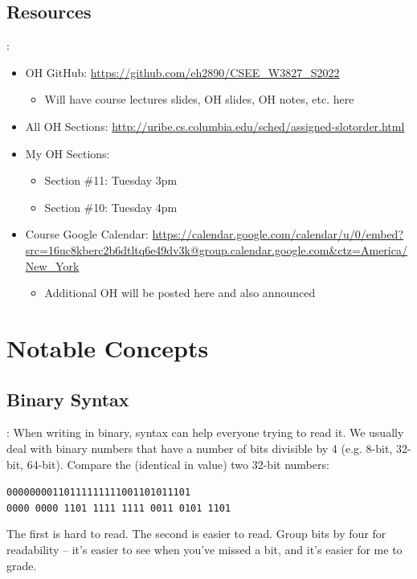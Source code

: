 \documentclass{../slides}
\begin{document}
\subsection{Resources}
\begin{frame}{\secname: \subsecname}
    \begin{itemize}
        \item OH GitHub: \url{https://github.com/eh2890/CSEE_W3827_S2022}
        \begin{itemize}
            \item Will have course lectures slides, OH slides, OH notes, etc. here
        \end{itemize}
        \item All OH Sections: \url{http://uribe.cs.columbia.edu/sched/assigned-slotorder.html}
        \item My OH Sections:
        \begin{itemize}
            \item Section \#11: Tuesday 3pm
            \item Section \#10: Tuesday 4pm
        \end{itemize}
        \item Course Google Calendar: \url{https://calendar.google.com/calendar/u/0/embed?src=16uc8kberc2b6dtltq6e49dv3k@group.calendar.google.com&ctz=America/New_York}
        \begin{itemize}
            \item Additional OH will be posted here and also announced
        \end{itemize}
    \end{itemize}
\end{frame}

\section{Notable Concepts}
\subsection{Binary Syntax}
\begin{frame}{\secname: \subsecname}
    When writing in binary, syntax can help everyone trying to read it. We usually deal with binary numbers that have a number of bits divisible by 4 (e.g. 8-bit, 32-bit, 64-bit). Compare the (identical in value) two 32-bit numbers:
    \begin{center}
        \lstinline{00000000110111111111001101011101}\\
        \lstinline{0000 0000 1101 1111 1111 0011 0101 1101}
    \end{center}
    The first is hard to read. The second is easier to read. Group bits by four for readability -- it's easier to see when you've missed a bit, and it's easier for me to grade.
\end{frame}
\end{document}
